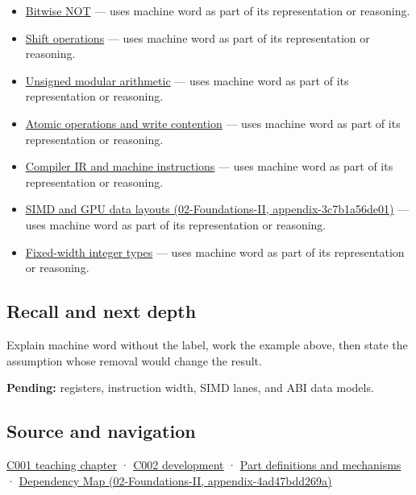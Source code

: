 \begin{itemize}
\tightlist
\item
  \hyperref[appendix-8f38927cfc54]{Bitwise NOT} --- uses machine word as part of its representation or reasoning.
\item
  \hyperref[appendix-73425b25118e]{Shift operations} --- uses machine word as part of its representation or reasoning.
\item
  \hyperref[appendix-c99977d88b33]{Unsigned modular arithmetic} --- uses machine word as part of its representation or reasoning.
\item
  \hyperref[appendix-e12d1b03fefb]{Atomic operations and write contention} --- uses machine word as part of its representation or reasoning.
\item
  \hyperref[appendix-942ad41afb30]{Compiler IR and machine instructions} --- uses machine word as part of its representation or reasoning.
\item
  \href{../02-Foundations-II/main.pdf\#nameddest=appendix-3c7b1a56de01}{SIMD and GPU data layouts (02-Foundations-II, appendix-3c7b1a56de01)} --- uses machine word as part of its representation or reasoning.
\item
  \hyperref[appendix-cc04044b5782]{Fixed-width integer types} --- uses machine word as part of its representation or reasoning.
\end{itemize}

\subsection{Recall and next depth}\label{appendix-d67a19507dc5-recall-and-next-depth}

Explain machine word without the label, work the example above, then state the assumption whose removal would change the result.

\textbf{Pending:} registers, instruction width, SIMD lanes, and ABI data models.

\subsection{Source and navigation}\label{appendix-d67a19507dc5-source-and-navigation}

\hyperref[01-foundations-i-ch001-from-a-signal-to-an-interpretation]{C001 teaching chapter} · \hyperref[01-foundations-i-ch001-arithmetic-becomes-a-policy]{C002 development} · \hyperref[appendix-fd090d982a15]{Part definitions and mechanisms} · \href{../02-Foundations-II/main.pdf\#nameddest=appendix-4ad47bdd269a}{Dependency Map (02-Foundations-II, appendix-4ad47bdd269a)}
